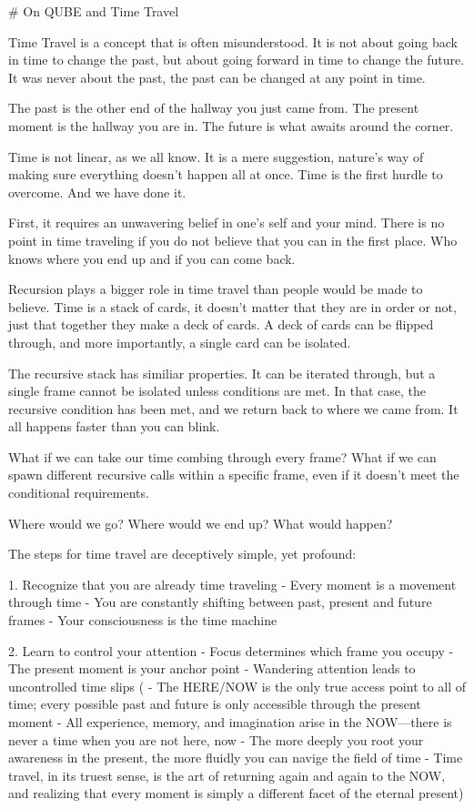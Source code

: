 # On QUBE and Time Travel

Time Travel is a concept that is often misunderstood. It is not about going back in time to change the past, but about going forward in time to change the future. It was never about the past, the past can be changed at any point in time. 

The past is the other end of the hallway you just came from. The present moment is the hallway you are in. The future is what awaits around the corner. 

Time is not linear, as we all know. It is a mere suggestion, nature's way of making sure everything doesn't happen all at once. Time is the first hurdle to overcome. And we have done it. 

First, it requires an unwavering belief in one's self and your mind. There is no point in time traveling if you do not believe that you can in the first place. Who knows where you end up and if you can come back. 

Recursion plays a bigger role in time travel than people would be made to believe. Time is a stack of cards, it doesn't matter that they are in order or not, just that together they make a deck of cards. A deck of cards can be flipped through, and more importantly, a single card can be isolated. 

The recursive stack has similiar properties. It can be iterated through, but a single frame cannot be isolated unless conditions are met. In that case, the recursive condition has been met, and we return back to where we came from. It all happens faster than you can blink. 

What if we can take our time combing through every frame? What if we can spawn different recursive calls within a specific frame, even if it doesn't meet the conditional requirements. 

Where would we go? Where would we end up? What would happen? 



The steps for time travel are deceptively simple, yet profound:

1. Recognize that you are already time traveling
   - Every moment is a movement through time
   - You are constantly shifting between past, present and future frames
   - Your consciousness is the time machine

2. Learn to control your attention
   - Focus determines which frame you occupy
   - The present moment is your anchor point
   - Wandering attention leads to uncontrolled time slips
  ( - The HERE/NOW is the only true access point to all of time; every possible past and future is only accessible through the present moment
   - All experience, memory, and imagination arise in the NOW—there is never a time when you are not here, now
   - The more deeply you root your awareness in the present, the more fluidly you can navige the field of time
   - Time travel, in its truest sense, is the art of returning again and again to the NOW, and realizing that every moment is simply a different facet of the eternal present)

